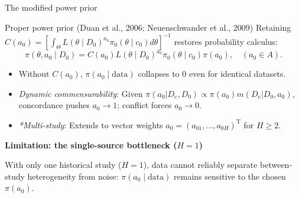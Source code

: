 \documentclass[t]{beamer}
\newcommand{\T}{\mathrm{T}}
\begin{document}
\begin{frame}{The modified power prior}
    \begin{block}{Proper power prior (Duan et al., 2006; Neuenschwander et al., 2009)}
    Retaining $C(a_0) = [ \int_\Theta L(\theta \mid D_0)^{a_0} \pi_0(\theta \mid c_0) d\theta ]^{-1}$ restores probability calculus:
    \begin{equation*}
        \pi(\theta, a_0 \mid D_0) = C(a_0) L(\theta \mid D_0)^{a_0} \pi_0(\theta \mid c_0) \pi(a_0), \quad (a_0 \in A).
    \end{equation*}
    \end{block}

    \begin{itemize}
        \item Without $C(a_0)$, $\pi(a_0 \mid \text{data})$ collapses to 0 even for identical datasets.
        \item \emph{Dynamic commensurability}:  Given $\pi(a_0 | D_e, D_0) \propto \pi(a_0)m(D_e | D_0, a_0)$, concordance pushes $a_0 \to 1$; conflict forces $a_0 \to 0$.
        \item \emph{*Multi-study}: Extends to vector weights $a_0 = (a_{01}, \dots, a_{0H})^\T$ for $H \ge 2$.
    \end{itemize}
    
    \vspace{0.20cm}
    \begin{highlightbox}
        \textbf{\textcolor{MyRed}{\small Limitation: the single-source bottleneck ($H = 1$)}}\par\vspace{2pt}
        {\footnotesize With only one historical study ($H=1$), data cannot reliably separate between-study heterogeneity from noise: $\pi(a_0 \mid \text{data})$ remains sensitive to the chosen $\pi(a_0)$.}
    \end{highlightbox}
\end{frame}
\end{document}
